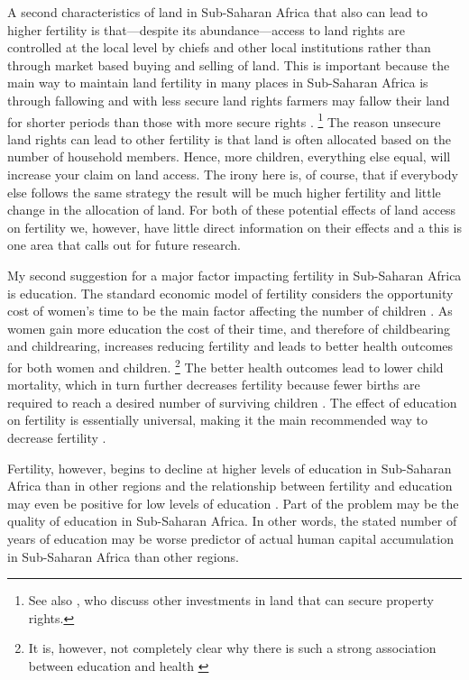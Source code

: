 \documentclass[letterpaper,12pt]{article}
\begin{document}
A second characteristics of land in Sub-Saharan Africa that
also can lead to higher fertility is that---despite its
abundance---access to land rights are controlled at the local
level by chiefs and other local institutions rather than through
market based buying and selling of land.
This is important because the main way to maintain land fertility
in many places in Sub-Saharan Africa is through fallowing and
with less secure land rights farmers may fallow their land
for shorter periods than those with more secure rights 
\citep{Goldstein2008}.%
\footnote{
See also \citet{besley95c}, who discuss other investments in
land that can secure property rights.
}
The reason unsecure land rights can lead to other fertility
is that land is often allocated based on the number of household
members.
Hence, more children, everything else equal, will increase your
claim on land access.
The irony here is, of course, that if everybody else follows
the same strategy the result will be much higher fertility
and little change in the allocation of land.
For both of these potential effects of land access on
fertility we, however, have little direct information on
their effects and a this is one area that calls out for
future research.

My second suggestion for a major factor impacting fertility
in Sub-Saharan Africa is education.
The standard economic model of fertility considers the 
opportunity cost of women's time to be the main factor 
affecting the number of children \citep{becker91}.
As women gain more education the cost of their time,
and therefore of childbearing and childrearing, increases
reducing fertility and leads to better health outcomes
for both women and children.%
\footnote{
It is, however, not completely clear why there is
such a strong association between education and health
\citep{Thomas1991,Glewwe1999,Kovsted2002}
}
The better health outcomes lead to lower child mortality,
which in turn further decreases fertility because fewer
births are required to reach a desired number of surviving
children \citep{Ainsworth1996}.
The effect of education on fertility is essentially universal,
making it the main recommended way to decrease 
fertility \citep{schultz02}.

Fertility, however, begins to decline at higher levels of 
education in Sub-Saharan Africa than in other regions
and the relationship between fertility and education
may even be positive for low levels of 
education  \citep{Ainsworth1996,Benefo1996,Thomas1996}.
Part of the problem may be the quality of education in Sub-Saharan 
Africa. 
In other words, the stated number of years of education
may be worse predictor of actual human capital accumulation
in Sub-Saharan Africa than other regions.
\end{document}
